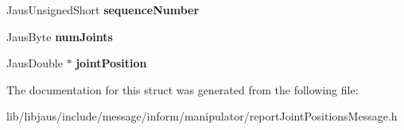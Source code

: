 \begin{DoxyCompactItemize}
\item 
\hypertarget{struct_report_joint_positions_message_struct_aca6794eee6b656f233267fd4c59721a4}{\-Jaus\-Unsigned\-Short {\bfseries sequence\-Number}}\label{struct_report_joint_positions_message_struct_aca6794eee6b656f233267fd4c59721a4}

\item 
\hypertarget{struct_report_joint_positions_message_struct_a1502fcbda97f3828a6f2b3e7cc940720}{\-Jaus\-Byte {\bfseries num\-Joints}}\label{struct_report_joint_positions_message_struct_a1502fcbda97f3828a6f2b3e7cc940720}

\item 
\hypertarget{struct_report_joint_positions_message_struct_adfa4495097fbff2fef3c3b6678e78ff8}{\-Jaus\-Double $\ast$ {\bfseries joint\-Position}}\label{struct_report_joint_positions_message_struct_adfa4495097fbff2fef3c3b6678e78ff8}

\end{DoxyCompactItemize}


\-The documentation for this struct was generated from the following file\-:\begin{DoxyCompactItemize}
\item 
lib/libjaus/include/message/inform/manipulator/report\-Joint\-Positions\-Message.\-h\end{DoxyCompactItemize}
